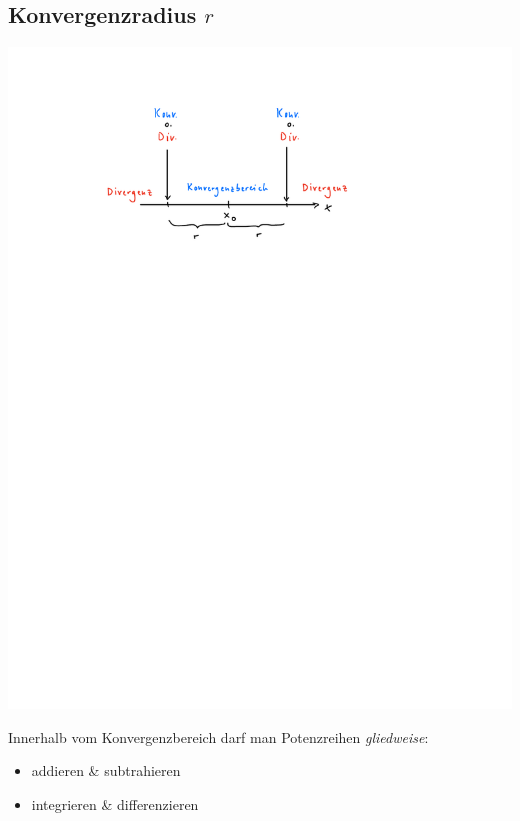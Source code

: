 \subsection{Konvergenzradius \hfill $r\ $}
    \vspace{0.5em}
    \begin{center}
            \includegraphics[width=0.65\linewidth]{src/Potenzreihen/konvergenzradius.pdf}
    \end{center}
    Innerhalb vom Konvergenzbereich darf man Potenzreihen \textit{gliedweise}:
    \begin{itemize}
        \item addieren \& subtrahieren
        \item integrieren \& differenzieren
    \end{itemize}